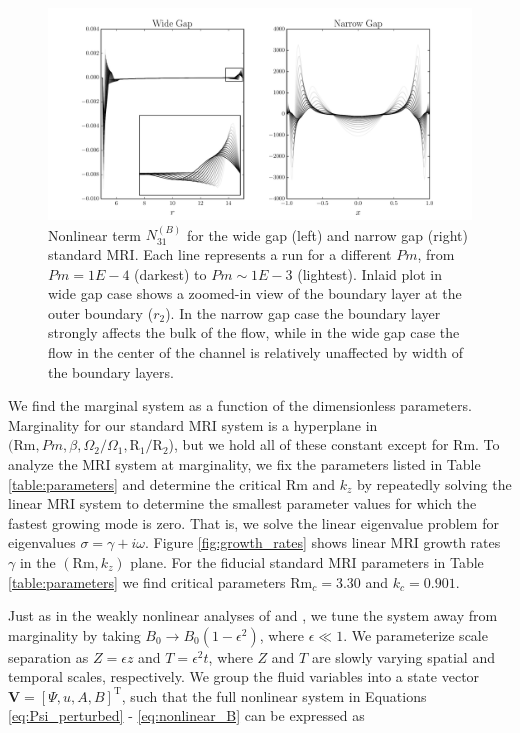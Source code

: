 \documentclass{emulateapj}
\newcommand{\citei}[1]{\citeauthor{#1} \citeyear{#1}}
\newcommand\reym{\mathrm{Rm}}
\begin{document}
\begin{figure}
\centering
\includegraphics[width=\textwidth]{../figures/wide_narrow_gap_N31_B.pdf}
\caption{Nonlinear term $N_{31}^{(B)}$ for the wide gap (left) and narrow gap (right) standard MRI. Each line represents a run for a different $Pm$, from $Pm = 1E-4$ (darkest) to $Pm \sim 1E-3$ (lightest). Inlaid plot in wide gap case shows a zoomed-in view of the boundary layer at the outer boundary ($r_2$). In the narrow gap case the boundary layer strongly affects the bulk of the flow, while in the wide gap case the flow in the center of the channel is relatively unaffected by width of the boundary layers.}\label{fig:wide_narrow_N31B}
\end{figure}

We find the marginal system as a function of the dimensionless parameters. Marginality for our standard MRI system is a hyperplane in $(\reym, Pm, \beta, \Omega_2/\Omega_1, \mathrm{R}_1/\mathrm{R}_2$), but we hold all of these constant except for $\reym$. To analyze the MRI system at marginality, we fix the parameters listed in Table \ref{table:parameters} and determine the critical $\reym$ and $k_z$ by repeatedly solving the linear MRI system to determine the smallest parameter values for which the fastest growing mode is zero. That is, we solve the linear eigenvalue problem for eigenvalues $\sigma = \gamma + i \omega$. Figure \ref{fig:growth_rates} shows linear MRI growth rates $\gamma$ in the $(\reym, k_z)$ plane. For the fiducial standard MRI parameters in Table \ref{table:parameters} we find critical parameters $\reym_c = 3.30$ and $k_c = 0.901$.

Just as in the weakly nonlinear analyses of \citei{Umurhan:2007hs} and \citei{Clark:2016}, we tune the system away from marginality by taking $B_0 \rightarrow B_0\left(1 - \epsilon^2\right)$, where $\epsilon \ll 1$. We parameterize scale separation as $Z = \epsilon z$ and $T = \epsilon^2 t$, where $Z$ and $T$ are slowly varying spatial and temporal scales, respectively. We group the fluid variables into a state vector $\mathbf{V} = \left[\Psi, u, A, B\right]^{\mathrm{T}}$, such that the full nonlinear system in Equations \ref{eq:Psi_perturbed} - \ref{eq:nonlinear_B} can be expressed as
\end{document}
